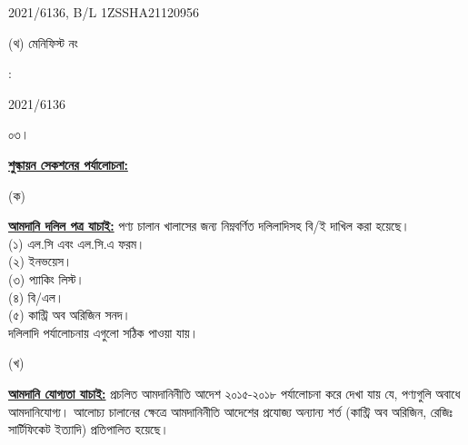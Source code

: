 \documentclass[12pt]{article}
\newcommand{\blno}{1ZSSHA21120956}
\newcommand{\menifest}{2021/6136}
\begin{document}
\begin{minipage}[t]{0.53\linewidth}
{\menifest}, B/L {\blno}
\\
\end{minipage}
\begin{minipage}[t]{0.05\linewidth}
\hspace*{1em}
\end{minipage}
\begin{minipage}[t]{0.40\linewidth}
(থ) মেনিফিস্ট নং
\end{minipage}
\begin{minipage}[t]{0.02\linewidth}
:
\end{minipage}
\begin{minipage}[t]{0.53\linewidth}
{\menifest}
\\
\end{minipage}
\normalsize
\begin{minipage}[t]{0.05\linewidth}
০৩।
\end{minipage}
\begin{minipage}[t]{0.95\linewidth}
\underline{\textbf{শুল্কায়ন সেকশনের পর্যালোচনা:}}
\end{minipage}
\begin{minipage}[t]{0.05\linewidth}
\hspace{1em}
\end{minipage}
\begin{minipage}[t]{0.05\linewidth}
(ক)
\end{minipage}
\begin{minipage}[t]{0.90\linewidth}
\underline{\textbf{আমদানি দলিল পত্র যাচাই:}}
পণ্য চালান খালাসের জন্য নিম্নবর্ণিত দলিলাদিসহ বি/ই দাখিল করা
হয়েছে।
\\
(১) এল.সি এবং এল.সি.এ ফরম।
\\
(২) ইনভয়েস।
\\
(৩) প্যাকিং লিস্ট।
\\
(৪) বি/এল।
\\
(৫) কান্ট্রি অব অরিজিন সনদ।
\\
দলিলাদি পর্যালোচনায় এগুলো
সঠিক পাওয়া যায়।
\\
\end{minipage}
\begin{minipage}[t]{0.05\linewidth}
\hspace{1em}
\end{minipage}
\begin{minipage}[t]{0.05\linewidth}
(খ)
\end{minipage}
\begin{minipage}[t]{0.90\linewidth}
\underline{\textbf{আমদানি যোগ্যতা যাচাই:}}
প্রচলিত আমদানিনীতি আদেশ ২০১৫-২০১৮  পর্যালোচনা করে দেখা যায় যে, পণ্যগুলি অবাধে আমদানিযোগ্য।
আলোচ্য চালানের ক্ষেত্রে আমদানিনীতি আদেশের প্রযোজ্য অন্যান্য শর্ত (কান্ট্রি অব অরিজিন, রেজিঃ
সার্টিফিকেট ইত্যাদি) প্রতিপালিত হয়েছে।
\\
\end{minipage}
\end{document}
